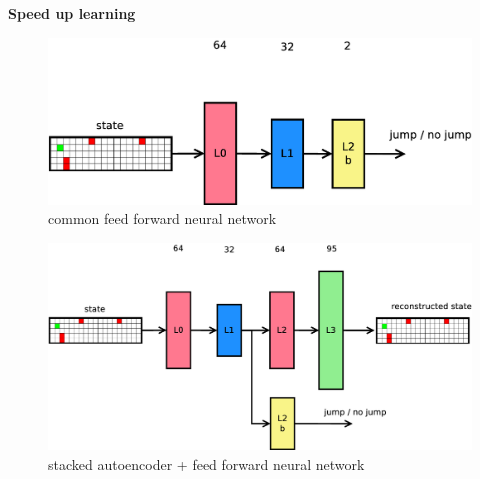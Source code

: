 \documentclass[xcolor=dvipsnames]{beamer}
\begin{document}
\begin{frame}{\bf Speed up learning}

\begin{figure}[htbp]
  \centering
  \includegraphics[scale=0.21]{../../diagrams/fnn.png}
  \caption*{common feed forward neural network}
\end{figure}

\begin{figure}[htbp]
  \centering
  \includegraphics[scale=0.21]{../../diagrams/hnn.png}
  \caption*{stacked autoencoder + feed forward neural network}
\end{figure}

\end{frame}
\end{document}
